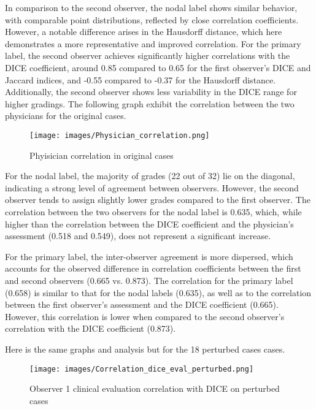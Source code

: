 In comparison to the second observer, the nodal label shows similar behavior, with comparable point distributions, reflected by close correlation coefficients. However, a notable difference arises in the Hausdorff distance, which here demonstrates a more representative and improved correlation. For the primary label, the second observer achieves significantly higher correlations with the DICE coefficient, around 0.85 compared to 0.65 for the first observer's DICE and Jaccard indices, and -0.55 compared to -0.37 for the Hausdorff distance. Additionally, the second observer shows less variability in the DICE range for higher gradings.
\newpage
The following graph exhibit the correlation between the two physicians for the original cases.
\begin{figure}[ht]
    \centering
    \texttt{[image: images/Physician\_correlation.png]}
    \caption{Phyisician correlation in original cases}
    \label{fig:three_subfigures}
\end{figure}

For the nodal label, the majority of grades (22 out of 32) lie on the diagonal, indicating a strong level of agreement between observers. However, the second observer tends to assign slightly lower grades compared to the first observer. The correlation between the two observers for the nodal label is 0.635, which, while higher than the correlation between the DICE coefficient and the physician’s assessment (0.518 and 0.549), does not represent a significant increase.

For the primary label, the inter-observer agreement is more dispersed, which accounts for the observed difference in correlation coefficients between the first and second observers (0.665 vs. 0.873). The correlation for the primary label (0.658) is similar to that for the nodal labels (0.635), as well as to the correlation between the first observer’s assessment and the DICE coefficient (0.665). However, this correlation is lower when compared to the second observer’s correlation with the DICE coefficient (0.873).\newpage  

Here is the same graphs and analysis but for the 18 perturbed cases cases.
\begin{figure}[ht]
    \centering
    \texttt{[image: images/Correlation\_dice\_eval\_perturbed.png]}
    \caption{Observer 1 clinical evaluation correlation with DICE on perturbed cases}
    \label{fig:three_subfigures}
\end{figure}

